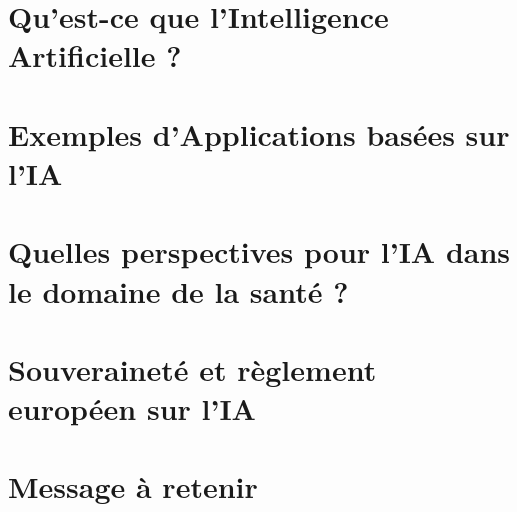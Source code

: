 \localized
\localized

\begin{bibliographysection}

\part[subtitle={Concepts et modèles clés de l'IA dans les applications modernes}]{Qu'est-ce que l'Intelligence Artificielle ?}
\localized
\localized
\localized
\localized
\localized
\localized
\localized
\localized

\part[subtitle={Principalement issus des projets du laboratoire CIAD}]{Exemples d'Applications basées sur l'IA}
\localized
\localized
\localized
\localized
\localized
\localized

\part[subtitle={IA et santé}]{Quelles perspectives pour l'IA dans le domaine de la santé ?}

\localized

\part[subtitle={Le point de vue d'un technologue}]{Souveraineté et règlement européen sur l'IA}

\localized

\part{Message à retenir}

\localized

\appendix

\end{bibliographysection}

\endinput
